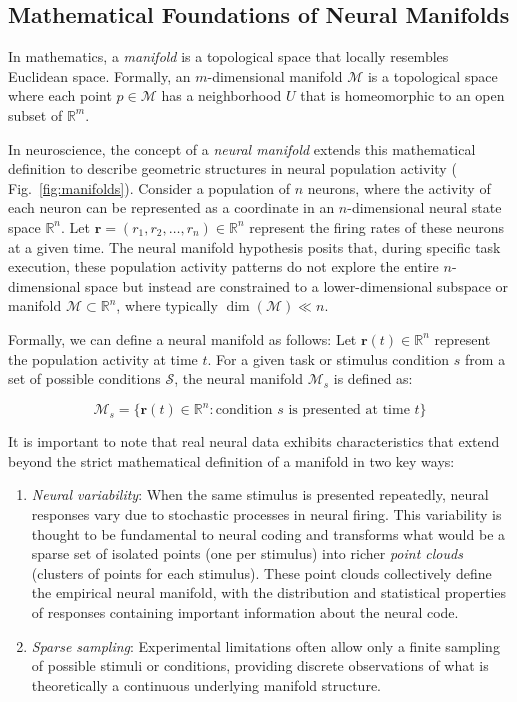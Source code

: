 \documentclass[11pt,a4paper]{article}
\begin{document}
\subsection{Mathematical Foundations of Neural Manifolds}

In mathematics, a \textit{manifold} is a topological space that locally resembles Euclidean space. Formally, an $m$-dimensional manifold $\mathcal{M}$ is a topological space where each point $p \in \mathcal{M}$ has a neighborhood $U$ that is homeomorphic to an open subset of $\mathbb{R}^m$. 

In neuroscience, the concept of a \textit{neural manifold} extends this mathematical definition to describe geometric structures in neural population activity ( Fig.~\ref{fig:manifolds}). Consider a population of $n$ neurons, where the activity of each neuron can be represented as a coordinate in an $n$-dimensional neural state space $\mathbb{R}^n$. Let $\mathbf{r} = (r_1, r_2, \ldots, r_n) \in \mathbb{R}^n$ represent the firing rates of these neurons at a given time. The neural manifold hypothesis posits that, during specific task execution, these population activity patterns do not explore the entire $n$-dimensional space but instead are constrained to a lower-dimensional subspace or manifold $\mathcal{M} \subset \mathbb{R}^n$, where typically $\dim(\mathcal{M}) \ll n$.

Formally, we can define a neural manifold as follows: Let $\mathbf{r}(t) \in \mathbb{R}^n$ represent the population activity at time $t$. For a given task or stimulus condition $s$ from a set of possible conditions $\mathcal{S}$, the neural manifold $\mathcal{M}_s$ is defined as:

\begin{equation}
\mathcal{M}_s = \{\mathbf{r}(t) \in \mathbb{R}^n : \text{condition } s \text{ is presented at time } t\}
\end{equation}

It is important to note that real neural data exhibits characteristics that extend beyond the strict mathematical definition of a manifold in two key ways:

\begin{enumerate}
    \item \textit{Neural variability}: When the same stimulus is presented repeatedly, neural responses vary due to stochastic processes in neural firing. This variability is thought to be fundamental to neural coding and transforms what would be a sparse set of isolated points (one per stimulus) into richer \textit{point clouds} (clusters of points for each stimulus). These point clouds collectively define the empirical neural manifold, with the distribution and statistical properties of responses containing important information about the neural code.
    
    \item \textit{Sparse sampling}: Experimental limitations often allow only a finite sampling of possible stimuli or conditions, providing discrete observations of what is theoretically a continuous underlying manifold structure.
\end{enumerate}
\end{document}
